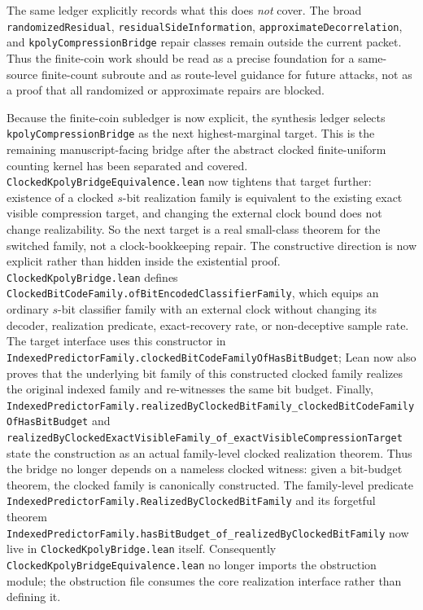 \documentclass[11pt]{article}
\theoremstyle{remark}
\begin{document}
The same ledger explicitly records what this does \emph{not} cover.  The broad
\texttt{randomizedResidual}, \texttt{residualSideInformation},
\texttt{approximateDecorrelation}, and \texttt{kpolyCompressionBridge} repair
classes remain outside the current packet.  Thus the finite-coin work should be
read as a precise foundation for a same-source finite-count subroute and as
route-level guidance for future attacks, not as a proof that all randomized or
approximate repairs are blocked.

Because the finite-coin subledger is now explicit, the synthesis ledger selects
\texttt{kpolyCompressionBridge} as the next highest-marginal target.  This is
the remaining manuscript-facing bridge after the abstract clocked
finite-uniform counting kernel has been separated and covered.
\texttt{ClockedKpolyBridgeEquivalence.lean} now tightens that target further:
existence of a clocked \(s\)-bit realization family is equivalent to the
existing exact visible compression target, and changing the external clock
bound does not change realizability.  So the next target is a real
small-class theorem for the switched family, not a clock-bookkeeping repair.
The constructive direction is now explicit rather than hidden inside the
existential proof.  \texttt{ClockedKpolyBridge.lean} defines
\texttt{ClockedBitCodeFamily.ofBitEncodedClassifierFamily}, which equips an
ordinary \(s\)-bit classifier family with an external clock without changing
its decoder, realization predicate, exact-recovery rate, or non-deceptive
sample rate.  The target
interface uses this constructor in
\texttt{IndexedPredictorFamily.clockedBitCodeFamilyOfHasBitBudget}; Lean now
also proves that the underlying bit family of this constructed clocked family
realizes the original indexed family and re-witnesses the same bit budget.
Finally,
\texttt{IndexedPredictorFamily.realizedByClockedBitFamily\_clockedBitCodeFamilyOfHasBitBudget}
and
\texttt{realizedByClockedExactVisibleFamily\_of\_exactVisibleCompressionTarget}
state the construction as an actual family-level clocked realization theorem.
Thus the bridge no longer depends on a nameless clocked witness: given a
bit-budget theorem, the clocked family is canonically constructed.  The
family-level predicate
\texttt{IndexedPredictorFamily.RealizedByClockedBitFamily} and its forgetful
theorem
\texttt{IndexedPredictorFamily.hasBitBudget\_of\_realizedByClockedBitFamily}
now live in \texttt{ClockedKpolyBridge.lean} itself.  Consequently
\texttt{ClockedKpolyBridgeEquivalence.lean} no longer imports the obstruction
module; the obstruction file consumes the core realization interface rather
than defining it.
\end{document}
